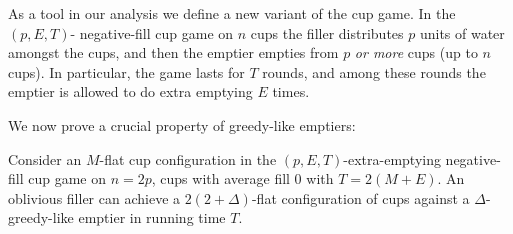 
As a tool in our analysis we define a new variant of the cup
game. In the $(p, E, T)$- negative-fill cup
game on $n$ cups the filler distributes $p$ units of water
amongst the cups, and then the emptier empties from $p$
\textit{or more} cups (up to $n$ cups). In particular, the
game lasts for $T$ rounds, and among these rounds the emptier is
allowed to do extra emptying $E$ times.

We now prove a crucial property of greedy-like emptiers: 
\begin{proposition}
  \label{prop:greedylikeisflat}
  Consider an $M$-flat cup configuration in the $(p, E,
  T)$-extra-emptying negative-fill cup game on $n = 2p$, cups
  with average fill $0$ with $T = 2(M + E)$. An oblivious filler
  can achieve a $2(2+\Delta)$-flat configuration of cups against
  a $\Delta$-greedy-like emptier in running time $T$.
\end{proposition}
